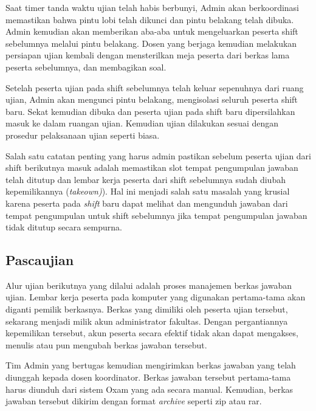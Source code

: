         Saat timer tanda waktu ujian telah habis berbunyi, Admin akan
        berkoordinasi memastikan bahwa pintu lobi telah dikunci dan pintu
        belakang telah dibuka. Admin kemudian akan memberikan aba-aba untuk
        mengeluarkan peserta shift sebelumnya melalui pintu belakang. Dosen yang
        berjaga kemudian melakukan persiapan ujian kembali dengan mensterilkan
        meja peserta dari berkas lama peserta sebelumnya, dan membagikan soal.
        
        Setelah peserta ujian pada shift sebelumnya telah keluar sepenuhnya dari
        ruang ujian, Admin akan mengunci pintu belakang, mengisolasi seluruh
        peserta shift baru. Sekat kemudian dibuka dan peserta ujian pada shift
        baru dipersilahkan masuk ke dalam ruangan ujian. Kemudian ujian
        dilakukan sesuai dengan prosedur pelaksanaan ujian seperti biasa.
        
        Salah satu catatan penting yang harus admin pastikan sebelum peserta
        ujian dari shift berikutnya masuk adalah memastikan slot tempat pengumpulan
        jawaban telah ditutup dan lembar kerja peserta dari shift sebelumnya sudah diubah
        kepemilikannya (\textit{takeown)}). Hal ini menjadi salah satu masalah yang krusial
        karena peserta pada \textit{shift} baru dapat melihat dan mengunduh jawaban dari tempat
        pengumpulan untuk shift sebelumnya jika tempat pengumpulan jawaban tidak ditutup secara sempurna.
    
    \subsection{Pascaujian}
        Alur ujian berikutnya yang dilalui adalah proses manajemen berkas
        jawaban ujian. Lembar kerja peserta pada komputer yang digunakan
        pertama-tama akan diganti pemilik berkasnya. Berkas yang dimiliki oleh
        peserta ujian tersebut, sekarang menjadi milik akun administrator
        fakultas. Dengan pergantiannya kepemilikan tersebut, akun peserta secara
        efektif tidak akan dapat mengakses, menulis atau pun mengubah berkas
        jawaban tersebut.
        
        Tim Admin yang bertugas kemudian mengirimkan berkas jawaban yang telah
        diunggah kepada dosen koordinator. Berkas jawaban tersebut pertama-tama
        harus diunduh dari sistem Oxam yang ada secara manual. Kemudian, berkas
        jawaban tersebut dikirim dengan format \textit{archive} seperti zip atau
        rar.

